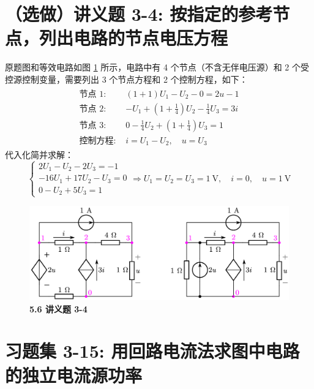 \documentclass[UTF8]{report}
\theoremstyle{MyLineTheoremStyle} %
\theoremstyle{MyBlockTheoremStyle} %
\theoremstyle{MySubsubsectionStyle} %
\begin{document}
\section{（选做）讲义题 3-4: 按指定的参考节点，列出电路的节点电压方程}

原题图和等效电路如图 \ref{5.6 讲义题 3-4} 所示，电路中有 4 个节点（不含无伴电压源）和 2 个受控源控制变量，需要列出 3 个节点方程和 2 个控制方程，如下：
\begin{align}
\begin{matrix}
    \text{节点 1: } & (1 + 1)U_1 - U_2 - 0 = 2u-1\\
    \text{节点 2: } & -U_1 + \left(1 + \frac{1}{4}\right)U_2 - \frac{1}{4}U_3 = 3 i  \\
    \text{节点 3: } &  0-\frac{1}{4}U_2 + \left(1 + \frac{1}{4}\right)U_3 = 1 \\
    \text{控制方程: } & i = U_1 - U_2,\quad u = U_3
\end{matrix}
\end{align}
代入化简并求解：
\begin{equation}
\begin{cases}
    2U_1 - U_2 -2 U_3 = -1\\ 
    -16U_1 + 17U_2 - U_3 = 0 \\ 
    0 - U_2 + 5U_3 = 1
\end{cases}\Longrightarrow 
U_1 = U_2 = U_3 = 1 \ \mathrm{V},\quad i = 0,\quad u = 1 \ \mathrm{V}
\end{equation}

\begin{figure}[H]\centering
\includegraphics[width=0.8\columnwidth]{assets/5/5.6.png}
\caption{\bfseries 5.6 讲义题 3-4}\label{5.6 讲义题 3-4}
\end{figure}

\section{习题集 3-15: 用回路电流法求图中电路的独立电流源功率}
\end{document}
